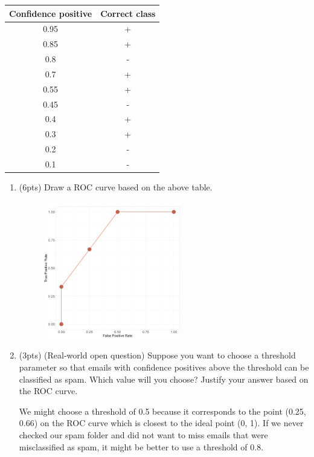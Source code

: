 \documentclass[a4paper]{article}
\theoremstyle{definition}
\newenvironment{soln}{
    \leavevmode\color{blue}\ignorespaces
}{}
\begin{document}
\begin{enumerate}
\begin{center}
\begin{tabular}{ c  c }
\hline
Confidence positive & Correct class \\ \hline
0.95 & + \\
0.85 & + \\
0.8 & - \\
0.7 & + \\
0.55 & + \\
0.45 & - \\
0.4 & + \\
0.3 & + \\
0.2 & - \\
0.1 & - \\
\hline
\end{tabular}
\end{center}

\begin{enumerate}
	\item (6pts) Draw a ROC curve based on the above table.
	
	\begin{soln} \begin{figure}[h]
		\centering
		\includegraphics[width=6cm]{figures/Q5.png}
	\end{figure} \end{soln}

	\medskip
	
	\item (3pts) (Real-world open question) Suppose you want to choose a threshold parameter so that emails with confidence positives above the threshold can be classified as spam. Which value will you choose? Justify your answer based on the ROC curve.
	
	\begin{soln}  We might choose a threshold of 0.5 because it corresponds to the point (0.25, 0.66) on the ROC curve which is closest to the ideal point (0, 1). If we never checked our spam folder and did not want to miss emails that were misclassified as spam, it might be better to use a threshold of 0.8. \end{soln}


\end{enumerate}
\end{enumerate}
\end{document}
